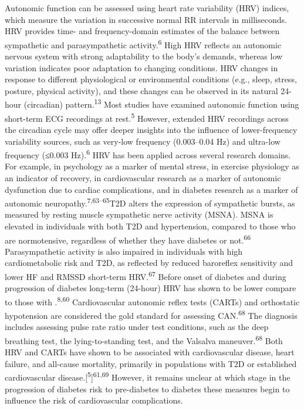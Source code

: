 \documentclass[
  letterpaper,
  headsepline=true,
  open=any]{scrbook}
\begin{document}
Autonomic function can be assessed using heart rate variability (HRV)
indices, which measure the variation in successive normal RR intervals
in milliseconds. HRV provides time- and frequency-domain estimates of
the balance between sympathetic and parasympathetic
activity.\textsuperscript{6} High HRV reflects an autonomic nervous
system with strong adaptability to the body's demands, whereas low
variation indicates poor adaptation to changing conditions. HRV changes
in response to different physiological or environmental conditions
(e.g., sleep, stress, posture, physical activity), and these changes can
be observed in its natural 24-hour (circadian)
pattern.\textsuperscript{13} Most studies have examined autonomic
function using short-term ECG recordings at rest.\textsuperscript{5}
However, extended HRV recordings across the circadian cycle may offer
deeper insights into the influence of lower-frequency variability
sources, such as very-low frequency (0.003--0.04 Hz) and ultra-low
frequency (≤0.003 Hz).\textsuperscript{6} HRV has been applied across
several research domains. For example, in psychology as a marker of
mental stress, in exercise physiology as an indicator of recovery, in
cardiovascular research as a marker of autonomic dysfunction due to
cardiac complications, and in diabetes research as a marker of autonomic
neuropathy.\textsuperscript{7,63--65}T2D alters the expression of
sympathetic bursts, as measured by resting muscle sympathetic nerve
activity (MSNA). MSNA is elevated in individuals with both T2D and
hypertension, compared to those who are normotensive, regardless of
whether they have diabetes or not.\textsuperscript{66} Parasympathetic
activity is also impaired in individuals with high cardiometabolic risk
and T2D, as reflected by reduced baroreflex sensitivity and lower HF and
RMSSD short-term HRV.\textsuperscript{67} Before onset of diabetes and
during progression of diabetes long-term (24-hour) HRV has shown to be
lower compare to those with .\textsuperscript{8,60} Cardiovascular
autonomic reflex tests (CARTs) and orthostatic hypotension are
considered the gold standard for assessing CAN.\textsuperscript{68} The
diagnosis includes assessing pulse rate ratio under test conditions,
such as the deep breathing test, the lying-to-standing test, and the
Valsalva maneuver.\textsuperscript{68} Both HRV and CARTs have shown to
be associated with cardiovascular disease, heart failure, and all-cause
mortality, primarily in populations with T2D or established
cardiovascular disease.{[}\textsuperscript{5}{]}\textsuperscript{61,69}
However, it remains unclear at which stage in the progression of
diabetes risk to pre-diabetes to diabetes these measures begin to
influence the risk of cardiovascular complications.
\end{document}
